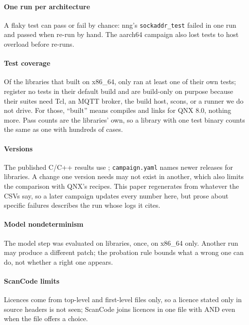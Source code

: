 \documentclass[conference]{IEEEtran}
\begin{document}
\paragraph{One run per architecture} A flaky test can pass or fail by chance: nng's \texttt{sockaddr\_test} failed
in one run and passed when re-run by hand. The aarch64 campaign also lost tests to host overload before re-runs.

\paragraph{Test coverage} Of the  libraries that built on x86\_64, only  ran at least
one of their own tests;  register no tests in their default build and  are
build-only on purpose because their suites need Tcl, an MQTT broker, the build host, scons, or a runner we do not drive. For those, ``built''
means compiles and links for QNX 8.0, nothing more. Pass counts are the libraries' own, so a library with one
test binary counts the same as one with hundreds of cases.

\paragraph{Versions} The published C/C++ results use ; \texttt{campaign.yaml} names newer
releases for  libraries. A change one version needs may not exist in another, which also
limits the comparison with QNX's recipes. This paper regenerates from whatever the CSVs say, so a later campaign
updates every number here, but prose about specific failures describes the run whose logs it cites.

\paragraph{Model nondeterminism} The model step was evaluated on  libraries, once, on x86\_64 only.
Another run may produce a different patch; the probation rule bounds what a wrong one can do, not whether a
right one appears.

\paragraph{ScanCode limits} Licences come from top-level and first-level files only, so a licence stated only in
source headers is not seen; ScanCode joins licences in one file with AND even when the file offers a choice.
\end{document}
